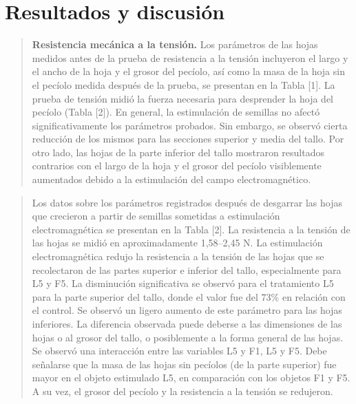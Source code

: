 \documentclass[
]{article}
\begin{document}
\section{Resultados y discusión}\label{resultados-y-discusiuxf3n}

\begin{quote}
\textbf{Resistencia mecánica a la tensión.} Los parámetros de las hojas
medidos antes de la prueba de resistencia a la tensión incluyeron el
largo y el ancho de la hoja y el grosor del pecíolo, así como la masa de
la hoja sin el pecíolo medida después de la prueba, se presentan en la
Tabla {[}1{]}. La prueba de tensión midió la fuerza necesaria para
desprender la hoja del pecíolo (Tabla {[}2{]}). En general, la
estimulación de semillas no afectó significativamente los parámetros
probados. Sin embargo, se observó cierta reducción de los mismos para
las secciones superior y media del tallo. Por otro lado, las hojas de la
parte inferior del tallo mostraron resultados contrarios con el largo de
la hoja y el grosor del pecíolo visiblemente aumentados debido a la
estimulación del campo electromagnético.
\end{quote}

\begin{quote}
Los datos sobre los parámetros registrados después de desgarrar las
hojas que crecieron a partir de semillas sometidas a estimulación
electromagnética se presentan en la Tabla {[}2{]}. La resistencia a la
tensión de las hojas se midió en aproximadamente 1,58--2,45 N. La
estimulación electromagnética redujo la resistencia a la tensión de las
hojas que se recolectaron de las partes superior e inferior del tallo,
especialmente para L5 y F5. La disminución significativa se observó para
el tratamiento L5 para la parte superior del tallo, donde el valor fue
del 73\% en relación con el control. Se observó un ligero aumento de
este parámetro para las hojas inferiores. La diferencia observada puede
deberse a las dimensiones de las hojas o al grosor del tallo, o
posiblemente a la forma general de las hojas. Se observó una interacción
entre las variables L5 y F1, L5 y F5. Debe señalarse que la masa de las
hojas sin pecíolos (de la parte superior) fue mayor en el objeto
estimulado L5, en comparación con los objetos F1 y F5. A su vez, el
grosor del pecíolo y la resistencia a la tensión se redujeron.
\end{quote}
\end{document}
